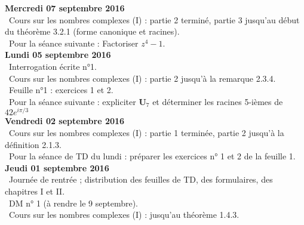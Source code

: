\documentclass[12pt,a4paper]{article}
\begin{document}
\noindent\textbf{Mercredi 07 septembre 2016}\\
\bu\ Cours sur les nombres complexes (I) : partie 2 terminé, partie 3 jusqu'au début du théorème 3.2.1 (forme canonique et racines).\\
\bu\ Pour la séance suivante : Factoriser $z^4-1$.\vspace{.4cm}\\

\noindent\textbf{Lundi 05 septembre 2016}\\
\bu\ Interrogation écrite n°1.\\
\bu\ Cours sur les nombres complexes (I) : partie 2 jusqu'à la remarque 2.3.4.\\
\bu\ Feuille n°1 : exercices 1 et 2.\\
\bu\ Pour la séance suivante : expliciter $\mathbf{U}_7$ et déterminer les racines 5-ièmes de $42 e^{i\pi/3}$\vspace{.4cm}\\

\noindent\textbf{Vendredi 02 septembre 2016}\\
\bu\ Cours sur les nombres complexes (I) : partie 1 terminée, partie 2 jusqu'à la définition 2.1.3.\\
\bu\ Pour la séance de TD du lundi : préparer les exercices n° 1 et 2 de la feuille 1. \vspace{.4cm}\\

\noindent\textbf{Jeudi 01 septembre 2016}\\
\bu\ Journée de rentrée ; distribution des feuilles de TD, des formulaires, des
chapitres I et II.  \\
\bu\ DM n° 1 (à
rendre le 9 septembre). \\
\bu\ Cours sur les nombres complexes (I) : jusqu'au théorème 1.4.3. 
\label{end}
\end{document}
